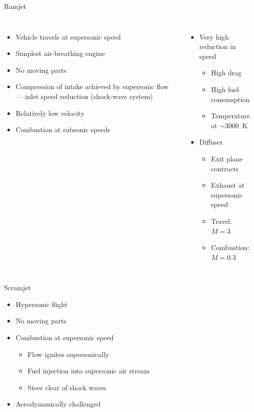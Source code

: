 \documentclass[10pt,aspectratio=43]{beamer}
\begin{document}
\begin{frame}{Ramjet}
  \begin{columns}[t]
    \begin{itemize}
      \item Vehicle travels at supersonic speed
      \item Simplest air-breathing engine
      \item No moving parts
      \item Compression of intake achieved by supersonic flow --- inlet
            speed reduction (shock-wave system)
      \item Relatively low velocity
      \item Combustion at subsonic speeds
    \end{itemize}
    \begin{itemize}
      \item Very high reduction in speed
        \begin{itemize}
          \item High drag
          \item High fuel consumption
          \item Temperature at $\sim\!3000$~K
        \end{itemize}
      \item Diffuser
        \begin{itemize}
          \item Exit plane contracts
          \item Exhaust at supersonic speed
          \item Travel: $M = 3$
          \item Combustion: $M = 0.3$
        \end{itemize}
    \end{itemize}
  \end{columns}
\end{frame}

\begin{frame}{Scramjet}
  \begin{itemize}
    \item Hypersonic flight
    \item No moving parts
    \item Combustion at supersonic speed
      \begin{itemize}
        \item Flow ignites supersonically
        \item Fuel injection into supersonic air stream
        \item Steer clear of shock waves
      \end{itemize}
    \item Aerodynamically challenged
  \end{itemize}
\end{frame}
\end{document}
